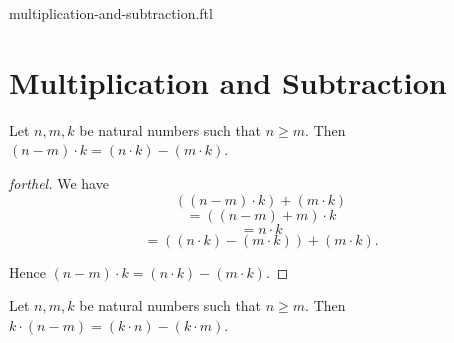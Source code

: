 \documentclass{naproche-library}
\begin{document}
\begin{smodule}{multiplication-and-subtraction.ftl}

  \section*{Multiplication and Subtraction}

  \begin{proposition}[forthel,id=ARITHMETIC_06_5458841930039296,printid]
    Let $n, m, k$ be natural numbers such that $n \geq m$.
    Then $(n - m) \cdot k = (n \cdot k) - (m \cdot k)$.
  \end{proposition}
  \begin{proof}[forthel]
    We have
    \[  ((n - m) \cdot k) + (m \cdot k)                 \]
    \[    = ((n - m) + m) \cdot k                       \]
    \[    = n \cdot k                                   \]
    \[    = ((n \cdot k) - (m \cdot k)) + (m \cdot k).  \]

    Hence $(n - m) \cdot k = (n \cdot k) - (m \cdot k)$.
  \end{proof}

  \begin{corollary}[forthel,id=ARITHMETIC_06_8461123277815808,printid]
    Let $n, m, k$ be natural numbers such that $n \geq m$.
    Then $k \cdot (n - m) = (k \cdot n) - (k \cdot m)$.
  \end{corollary}
\end{smodule}
\end{document}

